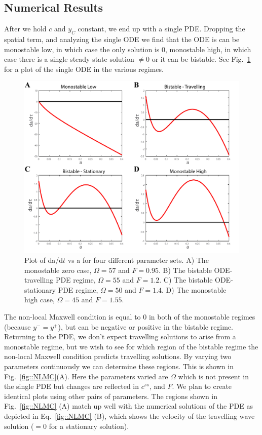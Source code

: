 \subsection{Numerical Results}


After we hold $c$ and $y_C$ constant, we end up with a single PDE. Dropping the spatial term, and analyzing the single ODE we find that the ODE is can be monostable low, in which case the only solution is $0$, monostable high, in which case there is a single steady state solution $\ne 0$ or it can be bistable. See Fig.~\ref{fig::phaseline} for a plot of the single ODE in the various regimes. 
\begin{figure}[h]
\centering
\captionsetup{width=0.9\linewidth}
\includegraphics[width=4.5in]{Project2/figs/phaseline.pdf}
\caption{Plot of da/d$t$ vs a for four different parameter sets. A) The monostable zero case, $\Omega = 57$ and $F = 0.95$. B) The bistable ODE-travelling PDE regime, $\Omega = 55$ and $F = 1.2$. C) The  bistable ODE-stationary PDE regime, $\Omega =50 $ and $F = 1.4$. D) The monostable high case,  $\Omega = 45$ and $F = 1.55$.}
\label{fig::phaseline}
\end{figure}

\hspace{6pt}

The non-local Maxwell condition is equal to $0$ in both of the monostable regimes (because $y^- = y^+$), but can be negative or positive in the bistable regime. Returning to the PDE, we don't expect travelling solutions to arise from a monostable regime, but we wish to see for which region of the bistable regime the non-local Maxwell condition predicts travelling solutions. By varying two parameters continuously we can determine these regions. This is shown in Fig.~\ref{fig::NLMC}(A). Here the parameters varied are $\Omega$ which is not present in the single PDE but changes are reflected in $c^{ss}$, and $F$. We plan to create identical plots using other pairs of parameters. The regions shown in Fig.~\ref{fig::NLMC} (A) match up well with the numerical solutions of the PDE as depicted in Eq.~\ref{fig::NLMC} (B), which shows the velocity of the travelling wave solution ($=0$ for a stationary solution).


